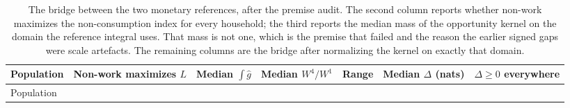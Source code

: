 \small\setlength{\tabcolsep}{3pt}\begin{longtable}[]{@{}
  >{\raggedright\arraybackslash}p{}
  >{\raggedright\arraybackslash}p{}
  >{\raggedright\arraybackslash}p{}
  >{\raggedright\arraybackslash}p{}
  >{\raggedright\arraybackslash}p{}
  >{\raggedright\arraybackslash}p{}
  >{\raggedright\arraybackslash}p{}@{}}
\caption{The bridge between the two monetary references, after the premise audit. The second column reports whether non-work maximizes the non-consumption index for every household; the third reports the median mass of the opportunity kernel on the domain the reference integral uses. That mass is not one, which is the premise that failed and the reason the earlier signed gaps were scale artefacts. The remaining columns are the bridge after normalizing the kernel on exactly that domain.}\tabularnewline
\toprule\noalign{}
\begin{minipage}[b]{\linewidth}\raggedright
Population
\end{minipage} & \begin{minipage}[b]{\linewidth}\raggedright
Non-work maximizes \(L\)
\end{minipage} & \begin{minipage}[b]{\linewidth}\raggedright
Median \(\int\hat g\)
\end{minipage} & \begin{minipage}[b]{\linewidth}\raggedright
Median \(W^4/W^1\)
\end{minipage} & \begin{minipage}[b]{\linewidth}\raggedright
Range
\end{minipage} & \begin{minipage}[b]{\linewidth}\raggedright
Median \(\Delta\) (nats)
\end{minipage} & \begin{minipage}[b]{\linewidth}\raggedright
\(\Delta\ge 0\) everywhere
\end{minipage} \\
\midrule\noalign{}
\endfirsthead
\toprule\noalign{}
\begin{minipage}[b]{\linewidth}\raggedright
Population
\end{minipage} & \begin{minipage}[b]{\linewidth}\raggedright

\end{minipage}
\end{longtable}
